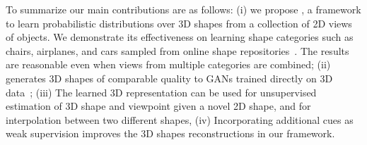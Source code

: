 To summarize our main contributions are as follows: (i) we propose
\prgan, a framework to learn probabilistic distributions over 3D
shapes from a collection of 2D views of objects. We demonstrate its
effectiveness on learning shape categories
such as chairs, airplanes, and cars sampled from online shape
repositories~\cite{chang2015shapenet,wu20153d}. 
The results are reasonable even when views from multiple categories
are combined; (ii) \prgan generates 3D shapes of comparable quality to GANs trained
directly on 3D data~\cite{wu2016learning};
(iii) The learned 3D representation can be used for unsupervised
estimation of 3D shape and viewpoint given a novel 2D shape, 
and for interpolation between two different shapes, (iv) Incorporating
additional cues as weak supervision improves the 3D shapes
reconstructions in our framework.


